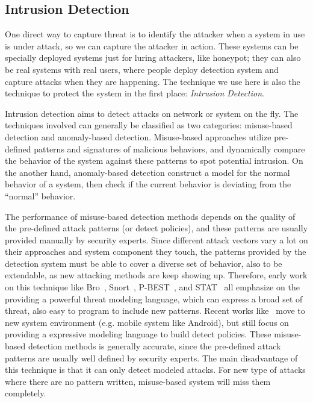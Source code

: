 \subsection{Intrusion Detection}

One direct way to capture threat is to identify the attacker when a
system in use is under attack, so we can capture the 
attacker in action. These systems can be specially deployed systems
just for luring attackers, like honeypot; they can also be real systems
with real users, where people deploy detection system and capture 
attacks when they are happening. The technique we use here is also 
the technique to protect the system in the first place:
\textit{Intrusion Detection}.

Intrusion detection aims to detect attacks on network or system on the
fly. The techniques involved can generally be classified as two 
categories: misuse-based detection and anomaly-based detection.
Misuse-based approaches utilize pre-defined patterns and signatures
of malicious behaviors, and dynamically compare the behavior of the
system against these patterns to spot potential intrusion. On the another
hand, anomaly-based detection construct a model for the normal behavior 
of a system, then check if the current behavior is deviating from the 
``normal'' behavior.

The performance of misuse-based detection methods depends on the quality
of the pre-defined attack patterns (or detect policies), and these 
patterns are usually provided manually by security experts. Since 
different attack vectors vary a lot on their approaches and system 
component they touch, the 
patterns provided by the detection system must be able to cover a 
diverse set of behavior, also to be extendable, as new attacking
methods are keep showing up. Therefore, early work on this technique like
Bro~\cite{paxson1999bro}, Snort~\cite{roesch1999snort}, 
P-BEST~\cite{lindqvist1999detecting}, and STAT~\cite{vigna2003designing}
all emphasize on the providing a powerful threat modeling language, which
can express a broad set of threat, also easy to program to include new 
patterns. Recent works like~\cite{bugiel2012towards} move to new
system environment (e.g. mobile system like Android), but still focus
on providing a expressive modeling language to build detect policies. 
These misuse-based detection methods is generally accurate, since the
pre-defined attack patterns are usually well defined by security experts. 
The main disadvantage of this technique is that it can only detect 
modeled attacks. For new type of attacks where there are no pattern
written, misuse-based system will miss them completely.

